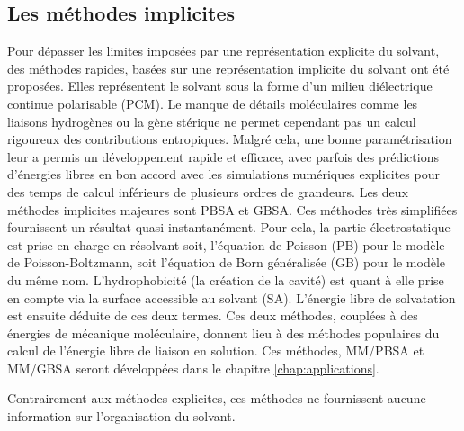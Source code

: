 \subsection{Les méthodes implicites}
Pour dépasser les limites imposées par une représentation explicite du solvant, des méthodes rapides, basées sur une représentation implicite du solvant ont été proposées\cite{Skyner_review_2015}. Elles représentent le solvant sous la forme d'un milieu diélectrique continue polarisable (PCM). Le manque de détails moléculaires comme les liaisons hydrogènes ou la gène stérique ne permet cependant pas un calcul rigoureux des contributions entropiques. Malgré cela, une bonne paramétrisation leur a permis un développement rapide et efficace, avec parfois des prédictions d'énergies libres en bon accord avec les simulations numériques explicites pour des temps de calcul inférieurs de plusieurs ordres de grandeurs. Les deux méthodes implicites majeures sont PBSA et GBSA. Ces méthodes très simplifiées fournissent un résultat quasi instantanément. Pour cela, la partie électrostatique est prise en charge en résolvant soit, l'équation de Poisson (PB) pour le modèle de Poisson-Boltzmann, soit l'équation de Born généralisée (GB) pour le modèle du même nom\cite{Skyner_review_2015}. L'hydrophobicité (la création de la cavité) est quant à elle prise en compte via la surface accessible au solvant (SA). L'énergie libre de solvatation est ensuite déduite de ces deux termes.  Ces deux méthodes, couplées à des énergies de mécanique moléculaire, donnent lieu à des méthodes populaires du calcul de l'énergie libre de liaison en solution. Ces méthodes, MM/PBSA et MM/GBSA\cite{kollman_calculating_2000,srinivasan_continuum_1998,genheden_mm/pbsa_2015} seront développées dans le chapitre \ref{chap:applications}.

Contrairement aux méthodes explicites, ces méthodes ne fournissent aucune information sur l'organisation du solvant.


